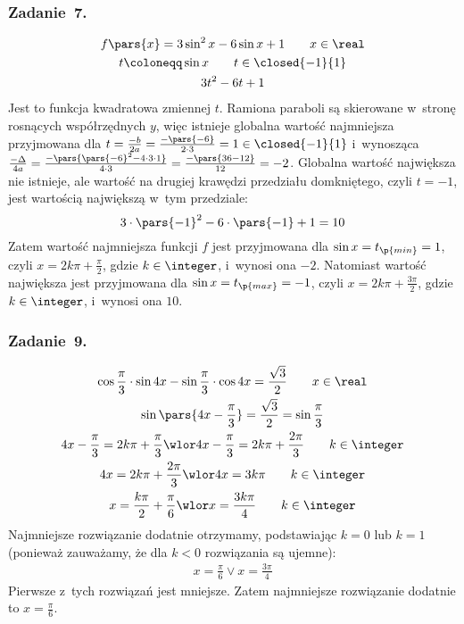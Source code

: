 \subsubsection*{Zadanie~7.}
\begin{gather*}
    f\pars{x} = 3\sin^2x - 6\sin x + 1 \qquad x \in \real\\
    t \coloneqq \sin x \qquad t \in \closed{-1}{1}\\
    3t^2 - 6t + 1
\end{gather*}
Jest to funkcja kwadratowa zmiennej \(t\). Ramiona paraboli są skierowane w~stronę rosnących współrzędnych \(y\), więc istnieje globalna wartość najmniejsza przyjmowana dla \(t = \frac{-b}{2a} = \frac{-\pars{-6}}{2 \cdot 3} = 1 \in \closed{-1}{1}\) i~wynosząca \(\frac{-\Delta}{4a} = \frac{-\pars{\pars{-6}^2 - 4 \cdot 3 \cdot 1}}{4 \cdot 3} = \frac{-\pars{36 - 12}}{12} = -2\). Globalna wartość największa nie istnieje, ale wartość na drugiej krawędzi przedziału domkniętego, czyli \(t = -1\), jest wartością największą w~tym przedziale:
\begin{equation*}
    3 \cdot \pars{-1}^2 - 6 \cdot \pars{-1} + 1 = 10
\end{equation*}
Zatem wartość najmniejsza funkcji \(f\) jest przyjmowana dla \(\sin x = t_\p{min} = 1\), czyli \(x = 2k\pi + \frac{\pi}{2}\), gdzie \(k \in \integer\), i~wynosi ona \(-2\). Natomiast wartość największa jest przyjmowana dla \(\sin x = t_\p{max} = -1\), czyli \(x = 2k\pi + \frac{3\pi}{2}\), gdzie \(k \in \integer\), i~wynosi ona \(10\).
\subsubsection*{Zadanie~9.}
\begin{gather*}
    \cos\frac{\pi}{3} \cdot \sin4x - \sin\frac{\pi}{3} \cdot \cos4x = \frac{\sqrt{3}}{2} \qquad x \in \real\\
    \sin\pars{4x - \frac{\pi}{3}} = \frac{\sqrt{3}}{2} = \sin\frac{\pi}{3}\\
    4x - \frac{\pi}{3} = 2k\pi + \frac{\pi}{3} \wlor 4x - \frac{\pi}{3} = 2k\pi + \frac{2\pi}{3} \qquad k \in \integer\\
    4x = 2k\pi + \frac{2\pi}{3} \wlor 4x = 3k\pi \qquad k \in \integer\\
    x = \frac{k\pi}{2} + \frac{\pi}{6} \wlor x = \frac{3k\pi}{4} \qquad k \in \integer
\end{gather*}
Najmniejsze rozwiązanie dodatnie otrzymamy, podstawiając \(k = 0\) lub \(k = 1\) (ponieważ zauważamy, że dla \(k < 0\) rozwiązania są ujemne):
\begin{gather*}
    x = \frac{\pi}{6} \lor x = \frac{3\pi}{4}
\end{gather*}
Pierwsze z~tych rozwiązań jest mniejsze. Zatem najmniejsze rozwiązanie dodatnie to \(x = \frac{\pi}{6}\).